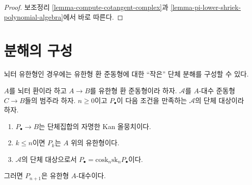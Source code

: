 \begin{proof}
보조정리 \ref{lemma-compute-cotangent-complex}과
\ref{lemma-pi-lower-shriek-polynomial-algebra}에서 바로 따른다.
\end{proof}





\section{분해의 구성}
\label{section-polynomial}

\noindent
뇌터 유한형인 경우에는 유한형 환 준동형에 대한 ``작은'' 단체 분해를
구성할 수 있다.

\begin{lemma}
\label{lemma-polynomial}
$A$를 뇌터 환이라 하고 $A\to B$를 유한형 환 준동형이라 하자.
$\mathcal{A}$를 $A$-대수 준동형 $C\to B$들의 범주라 하자. $n\geq0$이고
$P_\bullet$이 다음 조건을 만족하는 $\mathcal{A}$의 단체 대상이라 하자.
\begin{enumerate}
\item $P_\bullet\to B$는 단체집합의 자명한 Kan 올뭉치이다.
\item $k\leq n$이면 $P_k$는 $A$ 위의 유한형이다.
\item $\mathcal{A}$의 단체 대상으로서
$P_\bullet=\text{cosk}_n\text{sk}_nP_\bullet$이다.
\end{enumerate}
그러면 $P_{n+1}$은 유한형 $A$-대수이다.
\end{lemma}

